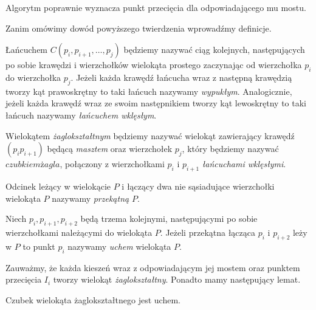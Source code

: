 \begin{twierdzenie}
  Algorytm poprawnie wyznacza punkt przecięcia dla odpowiadającego mu
  mostu.
\end{twierdzenie}

Zanim omówimy dowód powyższego twierdzenia wprowadźmy definicje.

\begin{definicja}
  Łańcuchem $C(p_i,p_{i+1},\ldots,p_j)$ będziemy nazywać ciąg
  kolejnych, następujących po sobie krawędzi i wierzchołków
  wielokąta prostego zaczynając od wierzchołka $p_i$ do wierzchołka
  $p_j$. Jeżeli każda krawędź łańcucha wraz z następną krawędzią
  tworzy kąt prawoskrętny to taki łańcuch nazywamy
  \emph{wypukłym}. Analogicznie, jeżeli każda krawędź wraz ze swoim
  następnikiem tworzy kąt lewoskrętny to taki łańcuch nazywamy
  \emph{łańcuchem wklęsłym}.
\end{definicja}

\begin{definicja}
  Wielokątem \emph{żaglokształtnym} będziemy nazywać wielokąt
  zawierający krawędź $(p_{i}p_{i+1})$ będącą \emph{masztem} oraz
  wierzchołek $p_j$, który będziemy nazywać $czubkiem żagla$,
  połączony z wierzchołkami $p_i$ i $p_{i+1}$ \emph{łańcuchami
    wklęsłymi}.
\end{definicja}

\begin{definicja}
  Odcinek leżący w wielokącie $P$ i łączący dwa nie sąsiadujące
  wierzchołki wielokąta $P$ nazywamy \emph{przekątną} $P$.
\end{definicja}

\begin{definicja}\label{def:ear}
  Niech $p_i, p_{i+1}, p_{i+2}$ będą trzema kolejnymi, następującymi
  po sobie wierzchołkami należącymi do wielokąta $P$. Jeżeli przekątna
  łącząca $p_{i}$ i $p_{i+2}$ leży w $P$ to punkt $p_i$ nazywamy
  \emph{uchem} wielokąta $P$.
\end{definicja}

Zauważmy, że każda kieszeń wraz z odpowiadającym jej mostem oraz
punktem przecięcia $I_i$ tworzy wielokąt
\emph{żaglokształtny}. Ponadto mamy następujący lemat.

\begin{lemat}\label{lem:sailtip}
  Czubek wielokąta żaglokształtnego jest uchem.
\end{lemat}


